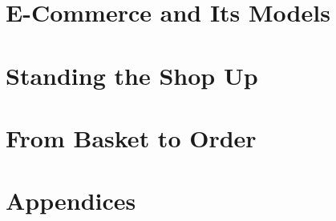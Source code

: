\documentclass[11pt,a4paper,oneside]{report}
\begin{document}


\part{E-Commerce and Its Models}






\part{Standing the Shop Up}






\part{From Basket to Order}



\appendix
\part*{Appendices}




\end{document}
